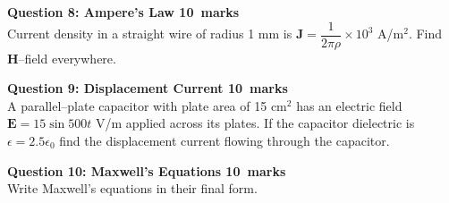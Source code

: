 \documentclass[12pt,a4paper]{article}
\def\Qeight{10}
\def\Qnine{10}
\def\Qten{10}
\begin{document}
\noindent\textbf{Question 8: Ampere's Law \hfill \Qeight~marks}\\
Current density in a straight wire of radius 1 mm is $\textbf{J}=\dfrac{1}{2\pi\rho}\times 10^3$ A/m$^2$. Find \textbf{H}--field everywhere.\\
\begin{figure}[H]
\end{figure}

\noindent\textbf{Question 9: Displacement Current \hfill \Qnine~marks}\\
A parallel--plate capacitor with plate area of 15 cm$^2$ has an electric field $\textbf{E}=15\sin 500t$ V/m applied across its plates. If the capacitor dielectric is $\epsilon=2.5\epsilon_0$ find the displacement current flowing through the capacitor.
\begin{figure}[H]
\end{figure}

\noindent\textbf{Question 10: Maxwell's Equations \hfill \Qten~marks}\\
Write Maxwell's equations in their final form.
\begin{figure}[H]
\end{figure}
\end{document}
